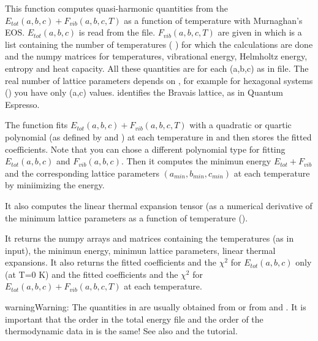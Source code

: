 \documentclass[letterpaper,10pt,english]{sphinxmanual}
\begin{document}
\begin{fulllineitems}
This function computes quasi-harmonic quantities from the 
\(E_{tot}(a,b,c)+F_{vib}(a,b,c,T)\) as a function of temperature with Murnaghan's
EOS. \(E_{tot}(a,b,c)\) is read from the  file. \(F_{vib}(a,b,c,T)\)
are given in  which is a list containing the number of temperatures
(  ) for which the calculations are done and the numpy matrices for 
temperatures, vibrational energy, Helmholtz energy, entropy and
heat capacity. All these quantities are for each (a,b,c) as in  file. The 
real number of lattice parameters depends on , for example for 
hexagonal systems () you have only (a,c) values.  identifies
the Bravais lattice, as in Quantum Espresso.

The function fits \(E_{tot}(a,b,c)+F_{vib}(a,b,c,T)\) with a quadratic
or quartic polynomial (as defined by  and  ) at each
temperature in  and then stores the fitted coefficients.    
Note that you can chose a different polynomial type for fitting \(E_{tot}(a,b,c)\)
and \(F_{vib}(a,b,c)\). Then it computes the minimun energy \(E_{tot}+F_{vib}\)
and the corresponding lattice parameters \((a_{min},b_{min},c_{min})\) 
at each temperature by miniimizing the energy.

It also computes the linear thermal expansion tensor (as a numerical derivative of
the minimum lattice parameters as a function of temperature ().

It returns the numpy arrays and matrices containing the temperatures (as in input), the
minimun energy, minimun lattice parameters, linear thermal expansions. It also
returns the fitted coefficients and the \(\chi^2\) for \(E_{tot}(a,b,c)\) 
only (at T=0 K) and the fitted coefficients and the \(\chi^2\) for 
\(E_{tot}(a,b,c)+F_{vib}(a,b,c,T)\) at each temperature.

\begin{sphinxadmonition}{warning}{Warning:}
The quantities in  are usually obtained from 
or from  and . It is
important that the order in the total energy file  and the order of
the thermodynamic data in  is the same!  See also  and 
the tutorial.
\end{sphinxadmonition}

\end{fulllineitems}
\end{document}

